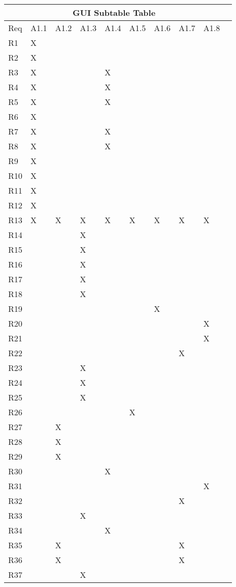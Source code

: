 \documentclass{article}
\begin{document}
\begin{tabular}{|l|l|l|l|l|l|l|l|l|l|}
\hline
\multicolumn{9}{|c|}{GUI Subtable Table}\\\hline
Req& A1.1& A1.2& A1.3& A1.4& A1.5& A1.6& A1.7& A1.8 \\\hline\hline
R1 &X&&&&&&& \\\hline
R2 &X&&&&&&& \\\hline
R3 &X&&&X&&&& \\\hline
R4 &X&&&X&&&& \\\hline
R5 &X&&&X&&&& \\\hline
R6 &X&&&&&&& \\\hline
R7 &X&&&X&&&& \\\hline
R8 &X&&&X&&&& \\\hline
R9 &X&&&&&&& \\\hline
R10 &X&&&&&&& \\\hline
R11 &X&&&&&&& \\\hline
R12 &X&&&&&&& \\\hline
R13 &X&X&X&X&X&X&X&X \\\hline
R14 &&&X&&&&& \\\hline
R15 &&&X&&&&& \\\hline
R16 &&&X&&&&& \\\hline
R17 &&&X&&&&& \\\hline
R18 &&&X&&&&& \\\hline
R19 &&&&&&X&& \\\hline
R20 &&&&&&&&X \\\hline
R21 &&&&&&&&X \\\hline
R22 &&&&&&&X& \\\hline
R23 &&&X&&&&& \\\hline
R24 &&&X&&&&& \\\hline
R25 &&&X&&&&& \\\hline
R26 &&&&&X&&& \\\hline
R27 &&X&&&&&& \\\hline
R28 &&X&&&&&& \\\hline
R29 &&X&&&&&& \\\hline
R30 &&&&X&&&& \\\hline
R31 &&&&&&&&X \\\hline
R32 &&&&&&&X& \\\hline
R33 &&&X&&&&& \\\hline
R34 &&&&X&&&& \\\hline
R35 &&X&&&&&X& \\\hline
R36 &&X&&&&&X& \\\hline
R37 &&&X&&&&& \\\hline

\end{tabular}
\end{document}
